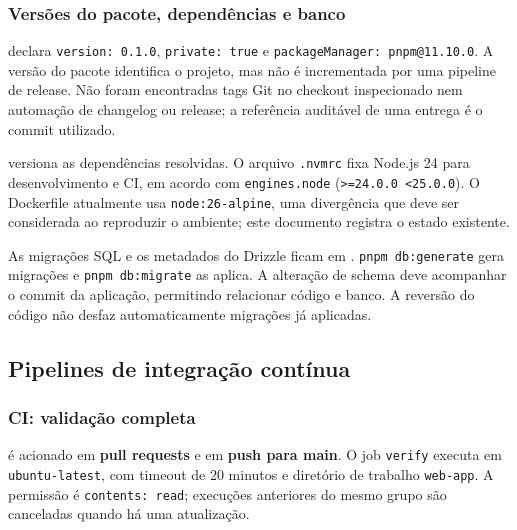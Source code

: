 \documentclass[12pt,a4paper]{article}
\begin{document}
\subsubsection{Versões do pacote, dependências e banco}
 declara \texttt{version: 0.1.0}, \texttt{private: true} e \texttt{packageManager: pnpm@11.10.0}. A versão do pacote identifica o projeto, mas não é incrementada por uma pipeline de release. Não foram encontradas tags Git no checkout inspecionado nem automação de changelog ou release; a referência auditável de uma entrega é o commit utilizado.

 versiona as dependências resolvidas. O arquivo \texttt{.nvmrc} fixa Node.js 24 para desenvolvimento e CI, em acordo com \texttt{engines.node} (\texttt{>=24.0.0 <25.0.0}). O Dockerfile atualmente usa \texttt{node:26-alpine}, uma divergência que deve ser considerada ao reproduzir o ambiente; este documento registra o estado existente.

As migrações SQL e os metadados do Drizzle ficam em . \texttt{pnpm db:generate} gera migrações e \texttt{pnpm db:migrate} as aplica. A alteração de schema deve acompanhar o commit da aplicação, permitindo relacionar código e banco. A reversão do código não desfaz automaticamente migrações já aplicadas.

\subsection{Pipelines de integração contínua}
\subsubsection{CI: validação completa}
 é acionado em \textbf{pull requests} e em \textbf{push para main}. O job \texttt{verify} executa em \texttt{ubuntu-latest}, com timeout de 20 minutos e diretório de trabalho \texttt{web-app}. A permissão é \texttt{contents: read}; execuções anteriores do mesmo grupo são canceladas quando há uma atualização.
\end{document}
